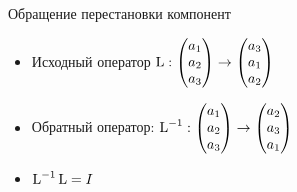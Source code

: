 \begin{frame}{Обращение перестановки компонент}

\begin{itemize}[<+->]
    \item 
Исходный оператор $\operatorname{L} : \begin{pmatrix}
  a_1 \\
  a_2 \\
  a_3 \\
\end{pmatrix} \to
\begin{pmatrix}
a_3 \\
a_1 \\
a_2 \\
\end{pmatrix}
$

\item \alert{Обратный оператор}:  
$\operatorname{L}^{-1} : \begin{pmatrix}
a_1 \\
a_2 \\
a_3 \\
    \end{pmatrix} \to
  \begin{pmatrix}
a_2 \\
a_3 \\
a_1 \\
    \end{pmatrix}
  $

\item $\operatorname{L}^{-1} \operatorname{L} = I$
\end{itemize}


\end{frame}
    


